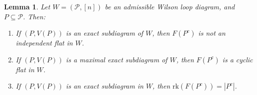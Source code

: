 \documentclass[11pt]{article}
\newcommand{\rk}{\textrm{rk} }
\newcommand{\cP}{\mathcal{P}}
\newcommand{\Prop}{\textrm{Prop}}
\newtheorem{lem}[thm]{Lemma}
\theoremstyle{remark}
\theoremstyle{definition}
\newtheorem{dfn}[thm]{Definition}
\begin{document}





\begin{lem} \label{maxexactcomplementrank}
Let $W = (\cP, [n])$ be an admissible Wilson loop diagram, and $P \subseteq \cP$. Then: \begin{enumerate}
\item If $(P,V(P))$ is an exact subdiagram of $W$, then $F(P^c)$ is not an independent flat in $W$.
\item If $(P,V(P))$ is a maximal exact subdiagram of $W$, then $F(P^c)$ is a cyclic flat in $W$.
\item If $(P,V(P))$ is an exact subdiagram in $W$, then $\rk(F(P^c)) = |P^c|$.
\end{enumerate} 
\end{lem}
\end{document}
